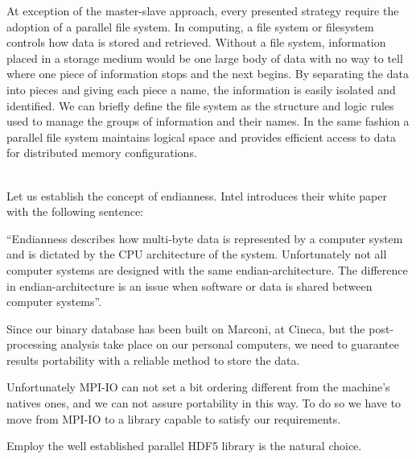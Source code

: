 At exception of the master-slave approach, every presented strategy require the adoption of a parallel file system.
In computing, a file system or filesystem controls how data is stored and retrieved. Without a file system, information placed in a storage medium would be one large body of data with no way to tell where one piece of information stops and the next begins. By separating the data into pieces and giving each piece a name, the information is easily isolated and identified. We can briefly define the file system as the structure and logic rules used to manage the groups of information and their names.
In the same fashion a parallel file system maintains logical space and provides efficient access to data for distributed memory configurations.\\~\par
Let us establish the concept of endianness.
Intel introduces their white paper with the following sentence:\par
``Endianness describes how multi-byte data is represented by a computer system and is dictated by the CPU architecture of the system. Unfortunately not all computer systems are designed with the same endian-architecture. The difference in endian-architecture is an issue when software or data is shared between computer systems''\cite{endianness}.\par
Since our binary database has been built on Marconi, at Cineca, but the post-processing analysis take place on our personal computers, we need to guarantee results portability with a reliable method to store the data. \\
\par
Unfortunately MPI-IO can not set a bit ordering different from the machine's natives ones, and we can not assure portability in this way. To do so we have to move from MPI-IO to a library capable to satisfy our requirements.\par
Employ the well established parallel HDF5 library is the natural choice.



